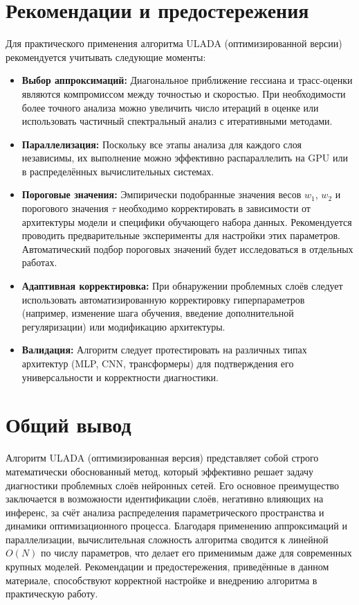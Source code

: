 \documentclass[a4paper,12pt]{article}
\begin{document}
\newpage

\section{Рекомендации и предостережения}

Для практического применения алгоритма ULADA (оптимизированной версии) рекомендуется учитывать следующие моменты:
\begin{itemize}
\item \textbf{Выбор аппроксимаций:} Диагональное приближение гессиана и трасс-оценки являются компромиссом между точностью и скоростью. При необходимости более точного анализа можно увеличить число итераций в оценке или использовать частичный спектральный анализ с итеративными методами.
\item \textbf{Параллелизация:} Поскольку все этапы анализа для каждого слоя независимы, их выполнение можно эффективно распараллелить на GPU или в распределённых вычислительных системах.
\item \textbf{Пороговые значения:} Эмпирически подобранные значения весов \( w_1 \), \( w_2 \) и порогового значения \(\tau\) необходимо корректировать в зависимости от архитектуры модели и специфики обучающего набора данных. Рекомендуется проводить предварительные эксперименты для настройки этих параметров. Автоматический подбор пороговых значений будет исследоваться в отдельных работах.
\item \textbf{Адаптивная корректировка:} При обнаружении проблемных слоёв следует использовать автоматизированную корректировку гиперпараметров (например, изменение шага обучения, введение дополнительной регуляризации) или модификацию архитектуры.
\item \textbf{Валидация:} Алгоритм следует протестировать на различных типах архитектур (MLP, CNN, трансформеры) для подтверждения его универсальности и корректности диагностики.
\end{itemize}

\section*{Общий вывод}

Алгоритм ULADA (оптимизированная версия) представляет собой строго математически обоснованный метод, который эффективно решает задачу диагностики проблемных слоёв нейронных сетей. Его основное преимущество заключается в возможности идентификации слоёв, негативно влияющих на инференс, за счёт анализа распределения параметрического пространства и динамики оптимизационного процесса. Благодаря применению аппроксимаций и параллелизации, вычислительная сложность алгоритма сводится к линейной \( O(N) \) по числу параметров, что делает его применимым даже для современных крупных моделей. Рекомендации и предостережения, приведённые в данном материале, способствуют корректной настройке и внедрению алгоритма в практическую работу.
\end{document}
